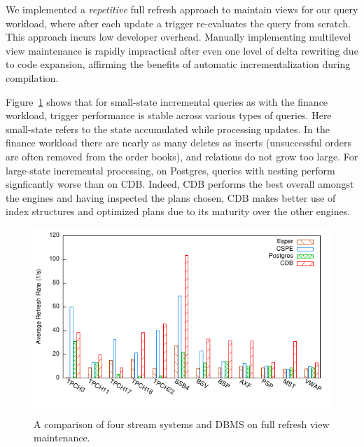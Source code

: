 We implemented a \textit{repetitive} full refresh approach to maintain views for
our query workload, where after each update a trigger re-evaluates the query
from scratch. This approach incurs low developer overhead. Manually implementing
multilevel view maintenance is rapidly impractical after even one level of delta
rewriting due to code expansion, affirming the benefits of automatic
incrementalization during compilation.

Figure~\ref{fig:enginecomp} shows that for small-state incremental queries
as with the finance workload, trigger performance is stable across various types
of queries. Here small-state refers to the state accumulated while
processing updates. In the finance workload there are nearly as
many deletes as inserts (unsuccessful orders are often removed from the order
books), and relations do not grow too large. For large-state incremental
processing, on Postgres, queries with nesting perform signficantly worse than on
CDB. Indeed, CDB performs the best overall amongst the engines and having
inspected the plans chosen, CDB makes better use of index structures and
optimized plans due to its maturity over the other engines.

\begin{figure}[t]
\vspace{-3mm}
\begin{center}
\includegraphics[scale=0.85]{../graphs/graphs/engine_bakeoff.pdf}
\end{center}
\vspace{-8mm}
\caption{A comparison of four stream systems and DBMS on full refresh view
maintenance.}
\label{fig:enginecomp}
\vspace{-4mm}
\end{figure}


